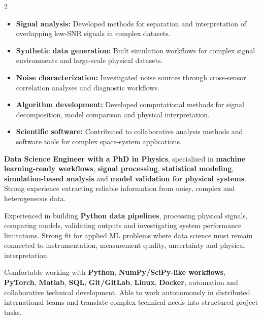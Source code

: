 \documentclass[8pt,a4paper,ragged2e,withhyper]{altacv}
\begin{document}
\begin{paracol}{2}
\begin{itemize}
\item \textbf{Signal analysis:} Developed methods for separation and interpretation of overlapping low-SNR signals in complex datasets.
\item \textbf{Synthetic data generation:} Built simulation workflows for complex signal environments and large-scale physical datasets.
\item \textbf{Noise characterization:} Investigated noise sources through cross-sensor correlation analyses and diagnostic workflows.
\item \textbf{Algorithm development:} Developed computational methods for signal decomposition, model comparison and physical interpretation.
\item \textbf{Scientific software:} Contributed to collaborative analysis methods and software tools for complex space-system applications.
\end{itemize}

\switchcolumn


\textbf{Data Science Engineer with a PhD in Physics}, specialized in \textbf{machine learning-ready workflows}, \textbf{signal processing}, \textbf{statistical modeling}, \textbf{simulation-based analysis} and \textbf{model validation for physical systems}. Strong experience extracting reliable information from noisy, complex and heterogeneous data.

Experienced in building \textbf{Python data pipelines}, processing physical signals, comparing models, validating outputs and investigating system performance limitations. Strong fit for applied ML problems where data science must remain connected to instrumentation, measurement quality, uncertainty and physical interpretation.

Comfortable working with \textbf{Python}, \textbf{NumPy/SciPy-like workflows}, \textbf{PyTorch}, \textbf{Matlab}, \textbf{SQL}, \textbf{Git/GitLab}, \textbf{Linux}, \textbf{Docker}, automation and collaborative technical development. Able to work autonomously in distributed international teams and translate complex technical needs into structured project tasks.



\end{paracol}
\end{document}

